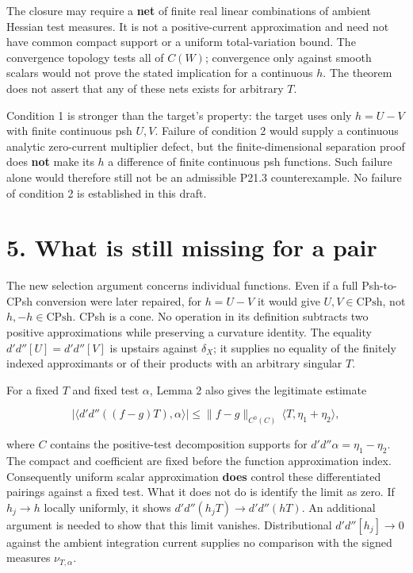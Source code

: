\documentclass[
  11pt,
]{article}
\begin{document}
The closure may require a \textbf{net} of finite real linear
combinations of ambient Hessian test measures. It is not a
positive-current approximation and need not have common compact support
or a uniform total-variation bound. The convergence topology tests all
of \(C(W)\); convergence only against smooth scalars would not prove the
stated implication for a continuous \(h\). The theorem does not assert
that any of these nets exists for arbitrary \(T\).

Condition 1 is stronger than the target's property: the target uses only
\(h=U-V\) with finite continuous psh \(U,V\). Failure of condition 2
would supply a continuous analytic zero-current multiplier defect, but
the finite-dimensional separation proof does \textbf{not} make its \(h\)
a difference of finite continuous psh functions. Such failure alone
would therefore still not be an admissible P21.3 counterexample. No
failure of condition 2 is established in this draft.

\section{5. What is still missing for a
pair}\label{what-is-still-missing-for-a-pair}

The new selection argument concerns individual functions. Even if a full
Psh-to-CPsh conversion were later repaired, for \(h=U-V\) it would give
\(U,V\in\mathrm{CPsh}\), not \(h,-h\in\mathrm{CPsh}\). CPsh is a cone.
No operation in its definition subtracts two positive approximations
while preserving a curvature identity. The equality
\(d'd''[U]=d'd''[V]\) is upstairs against \(\delta_X\); it supplies no
equality of the finitely indexed approximants or of their products with
an arbitrary singular \(T\).

For a fixed \(T\) and fixed test \(\alpha\), Lemma 2 also gives the
legitimate estimate

\[
|\langle d'd''((f-g)T),\alpha\rangle|
 \leq \|f-g\|_{C^0(C)}\,
 \langle T,\eta_1+\eta_2\rangle,
\]

where \(C\) contains the positive-test decomposition supports for
\(d'd''\alpha=\eta_1-\eta_2\). The compact and coefficient are fixed
before the function approximation index. Consequently uniform scalar
approximation \textbf{does} control these differentiated pairings
against a fixed test. What it does not do is identify the limit as zero.
If \(h_j\to h\) locally uniformly, it shows
\(d'd''(h_jT)\to d'd''(hT)\). An additional argument is needed to show
that this limit vanishes. Distributional \(d'd''[h_j]\to0\) against the
ambient integration current supplies no comparison with the signed
measures \(\nu_{T,\alpha}\).
\end{document}
